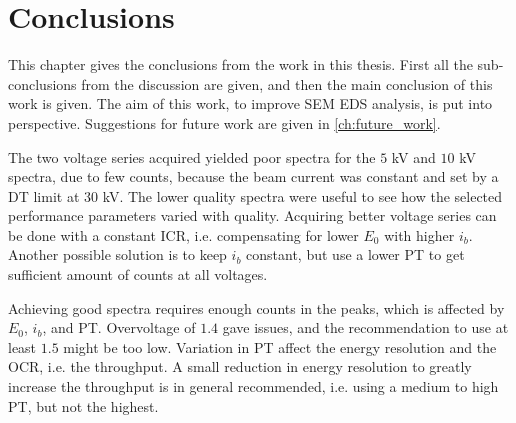 \chapter{Conclusions}
\label{ch:conclusion}

This chapter gives the conclusions from the work in this thesis.
First all the sub-conclusions from the discussion are given, and then the main conclusion of this work is given.
The aim of this work, to improve SEM EDS analysis, is put into perspective.
Suggestions for future work are given in \cref{ch:future_work}.











The two voltage series acquired yielded poor spectra for the $5$ kV and $10$ kV spectra, due to few counts, because the beam current was constant and set by a DT limit at $30$ kV.
The lower quality spectra were useful to see how the selected performance parameters varied with quality.
Acquiring better voltage series can be done with a constant ICR, i.e. compensating for lower $E_0$ with higher $i_b$.
Another possible solution is to keep $i_b$ constant, but use a lower PT to get sufficient amount of counts at all voltages.

Achieving good spectra requires enough counts in the peaks, which is affected by $E_0$, $i_b$, and PT.
Overvoltage of $1.4$ gave issues, and the recommendation to use at least $1.5$ might be too low.
Variation in PT affect the energy resolution and the OCR, i.e. the throughput.
A small reduction in energy resolution to greatly increase the throughput is in general recommended, i.e. using a medium to high PT, but not the highest.

